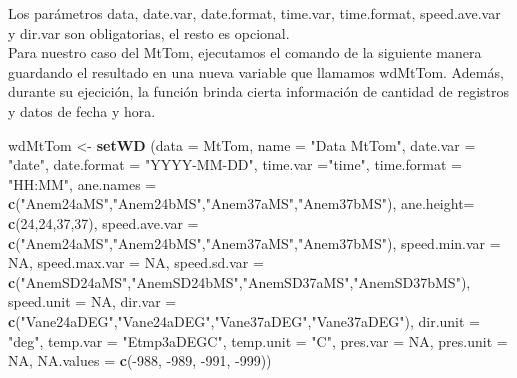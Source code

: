 \documentclass[]{article}
\newenvironment{Shaded}{\begin{snugshade}}{\end{snugshade}}
\newcommand{\KeywordTok}[1]{\textcolor[rgb]{0.13,0.29,0.53}{\textbf{{#1}}}}
\newcommand{\DataTypeTok}[1]{\textcolor[rgb]{0.13,0.29,0.53}{{#1}}}
\newcommand{\DecValTok}[1]{\textcolor[rgb]{0.00,0.00,0.81}{{#1}}}
\newcommand{\StringTok}[1]{\textcolor[rgb]{0.31,0.60,0.02}{{#1}}}
\newcommand{\OtherTok}[1]{\textcolor[rgb]{0.56,0.35,0.01}{{#1}}}
\newcommand{\NormalTok}[1]{{#1}}
\begin{document}
Los parámetros data, date.var, date.format, time.var, time.format,
speed.ave.var y dir.var son obligatorias, el resto es opcional.\\Para
nuestro caso del MtTom, ejecutamos el comando de la siguiente manera
guardando el resultado en una nueva variable que llamamos wdMtTom.
Además, durante su ejecición, la función brinda cierta información de
cantidad de registros y datos de fecha y hora.

\begin{Shaded}
\begin{Highlighting}[]
\NormalTok{wdMtTom <-}\StringTok{ }\KeywordTok{setWD} \NormalTok{(}\DataTypeTok{data =} \NormalTok{MtTom, }
                  \DataTypeTok{name =} \StringTok{"Data MtTom"}\NormalTok{,}
                  \DataTypeTok{date.var =} \StringTok{"date"}\NormalTok{, }
                  \DataTypeTok{date.format =} \StringTok{"YYYY-MM-DD"}\NormalTok{, }
                  \DataTypeTok{time.var =}\StringTok{"time"}\NormalTok{, }
                  \DataTypeTok{time.format =} \StringTok{"HH:MM"}\NormalTok{,}
                  \DataTypeTok{ane.names =} \KeywordTok{c}\NormalTok{(}\StringTok{"Anem24aMS"}\NormalTok{,}\StringTok{"Anem24bMS"}\NormalTok{,}\StringTok{"Anem37aMS"}\NormalTok{,}\StringTok{"Anem37bMS"}\NormalTok{),}
                  \DataTypeTok{ane.height=} \KeywordTok{c}\NormalTok{(}\DecValTok{24}\NormalTok{,}\DecValTok{24}\NormalTok{,}\DecValTok{37}\NormalTok{,}\DecValTok{37}\NormalTok{),}
                  \DataTypeTok{speed.ave.var =} \KeywordTok{c}\NormalTok{(}\StringTok{"Anem24aMS"}\NormalTok{,}\StringTok{"Anem24bMS"}\NormalTok{,}\StringTok{"Anem37aMS"}\NormalTok{,}\StringTok{"Anem37bMS"}\NormalTok{),}
                  \DataTypeTok{speed.min.var =} \OtherTok{NA}\NormalTok{,}
                  \DataTypeTok{speed.max.var =} \OtherTok{NA}\NormalTok{,}
                  \DataTypeTok{speed.sd.var =} \KeywordTok{c}\NormalTok{(}\StringTok{"AnemSD24aMS"}\NormalTok{,}\StringTok{"AnemSD24bMS"}\NormalTok{,}\StringTok{"AnemSD37aMS"}\NormalTok{,}\StringTok{"AnemSD37bMS"}\NormalTok{),}
                  \DataTypeTok{speed.unit =} \OtherTok{NA}\NormalTok{,}
                  \DataTypeTok{dir.var =} \KeywordTok{c}\NormalTok{(}\StringTok{"Vane24aDEG"}\NormalTok{,}\StringTok{"Vane24aDEG"}\NormalTok{,}\StringTok{"Vane37aDEG"}\NormalTok{,}\StringTok{"Vane37aDEG"}\NormalTok{),}
                  \DataTypeTok{dir.unit =} \StringTok{"deg"}\NormalTok{,}
                  \DataTypeTok{temp.var =} \StringTok{"Etmp3aDEGC"}\NormalTok{,}
                  \DataTypeTok{temp.unit =} \StringTok{"C"}\NormalTok{,}
                  \DataTypeTok{pres.var =} \OtherTok{NA}\NormalTok{,}
                  \DataTypeTok{pres.unit =} \OtherTok{NA}\NormalTok{,}
                  \DataTypeTok{NA.values =} \KeywordTok{c}\NormalTok{(-}\DecValTok{988}\NormalTok{, -}\DecValTok{989}\NormalTok{, -}\DecValTok{991}\NormalTok{, -}\DecValTok{999}\NormalTok{))}
\end{Highlighting}
\end{Shaded}
\end{document}
